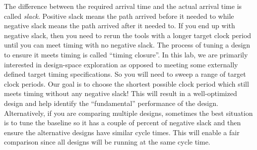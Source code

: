 \documentclass[a4paper,12pt,twoside]{article}
\begin{document}
The difference between the required arrival time and the actual arrival time is called \textit{slack}. Positive slack means the path arrived before it needed to while negative slack means the path arrived after it needed to. If you end up with negative slack, then you need to rerun the tools with a longer target clock period until you can meet timing with no negative slack. The process of tuning a design to ensure it meets timing is called “timing closure”. In this lab, we are primarily interested in design-space exploration as opposed to meeting some externally defined target timing specifications. So you will need to sweep a range of target clock periods. Our goal is to choose the shortest possible clock period which still meets timing without any negative slack! This will result in a well-optimized design and help identify the “fundamental” performance of the design. Alternatively, if you are comparing multiple designs, sometimes the best situation is to tune the baseline so it has a couple of percent of negative slack and then ensure the alternative designs have similar cycle times. This will enable a fair comparison since all designs will be running at the same cycle time.
\end{document}
